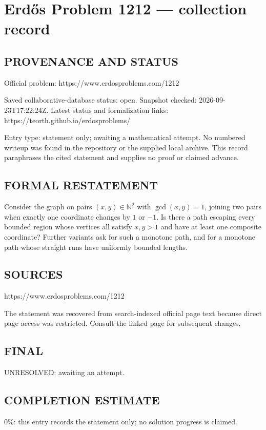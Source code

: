 \section*{Erd\H{o}s Problem 1212 --- collection record}

\subsection*{PROVENANCE AND STATUS}
Official problem: https://www.erdosproblems.com/1212

Saved collaborative-database status: open.
Snapshot checked: 2026-09-23T17:22:24Z.
Latest status and formalization links: https://teorth.github.io/erdosproblems/

Entry type: statement only; awaiting a mathematical attempt. No numbered writeup was found in the repository or the supplied local archive. This record paraphrases the cited statement and supplies no proof or claimed advance.

\subsection*{FORMAL RESTATEMENT}
Consider the graph on pairs $(x,y)\in\mathbb N^2$ with $\gcd(x,y)=1$, joining two pairs when exactly one coordinate changes by $1$ or $-1$. Is there a path escaping every bounded region whose vertices all satisfy $x,y>1$ and have at least one composite coordinate? Further variants ask for such a monotone path, and for a monotone path whose straight runs have uniformly bounded lengths.

\subsection*{SOURCES}
https://www.erdosproblems.com/1212

The statement was recovered from search-indexed official page text because direct page access was restricted. Consult the linked page for subsequent changes.

\subsection*{FINAL}
UNRESOLVED: awaiting an attempt.

\subsection*{COMPLETION ESTIMATE}
$0\%$: this entry records the statement only; no solution progress is claimed.
